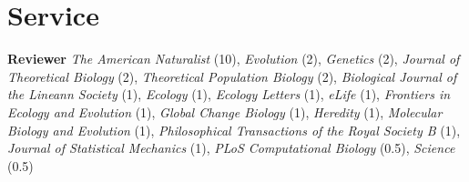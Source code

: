 \documentclass[12pt]{article}
\begin{document}
\section*{Service}

\noindent \textbf{Reviewer} \textit{The American Naturalist} (10), \textit{Evolution} (2), \textit{Genetics} (2), \textit{Journal of Theoretical Biology} (2), \textit{Theoretical Population Biology} (2), \textit{Biological Journal of the Lineann Society} (1), \textit{Ecology} (1), \textit{Ecology Letters} (1), \textit{eLife} (1), \textit{Frontiers in Ecology and Evolution} (1), \textit{Global Change Biology} (1), \textit{Heredity} (1), \textit{Molecular Biology and Evolution} (1), \textit{Philosophical Transactions of the Royal Society B} (1), \textit{Journal of Statistical Mechanics} (1), \textit{PLoS Computational Biology} (0.5), \textit{Science} (0.5)

%
\end{document}
